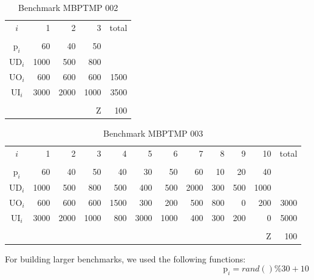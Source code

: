 \documentclass[preprint,12pt,authoryear]{elsarticle}
\begin{document}
\begin{table}[h]
\begin{center}
\begin{tabular}[c]{c r r r r}
$i$ & 1 & 2 & 3 & total \\
\cline {1-5} \\
$\textrm{p}_i$ & 60 & 40 & 50 \\
$\textrm{UD}_i$ & 1000 & 500 & 800 \\
$\textrm{UO}_i$ & 600 & 600 & 600 & 1500 \\
$\textrm{UI}_i$ & 3000 & 2000 & 1000 & 3500 \\
\cline {1-5} \\
& & & $\textrm{Z}$ & 100 \\
\end{tabular}
\label{tab:MBPTMP 001}
\caption{Benchmark MBPTMP 002}
\end{center}
\end{table}

\begin{table}[h]
\begin{center}
\begin{small}
\begin{tabular}[c]{c r r r r r r r r r r r }
$i$ & 1 & 2 & 3 & 4 & 5 & 6 & 7 & 8 & 9 & 10 & total \\
\cline {1-12} \\
$\textrm{p}_i$ & 60 & 40 & 50 & 40 & 30 & 50 & 60 & 10 & 20 & 40\\
$\textrm{UD}_i$ & 1000 & 500 & 800 & 500 & 400 & 500 & 2000 & 300 & 500 & 1000 \\
$\textrm{UO}_i$ & 600 & 600 & 600 & 1500 & 300 & 200 & 500 & 800 & 0 & 200 & 3000 \\
$\textrm{UI}_i$ & 3000 & 2000 & 1000 & 800 & 3000 & 1000 & 400 & 300 & 200 & 0 & 5000 \\
\cline {1-12} \\
& & & & & & & & & & $\textrm{Z}$ & 100 \\
\end{tabular}
\label{tab:MBPTMP 001}
\caption{Benchmark MBPTMP 003}
\end{small}
\end{center}
\end{table}

For building larger benchmarks, we used the following functions: \\

\begin{equation}
\textrm{p}_i = rand()\%30 + 10
\end{equation}
\end{document}
